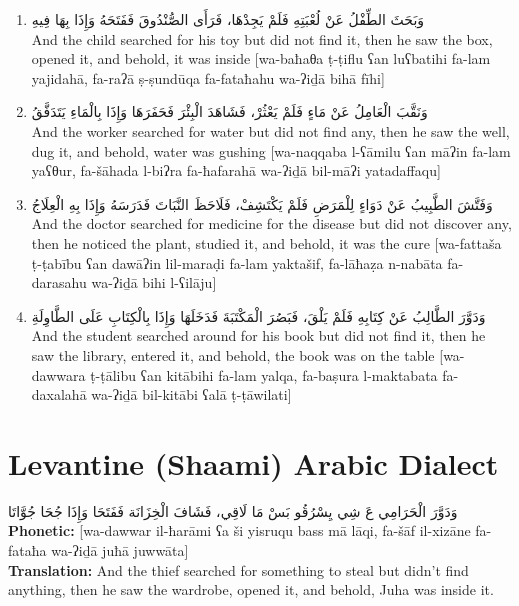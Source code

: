 \documentclass[letterpaper,12pt]{article}
\begin{document}
\begin{enumerate}
\item \textarabic{وَبَحَثَ الطِّفْلُ عَنْ لُعْبَتِهِ فَلَمْ يَجِدْهَا، فَرَأَى الصُّنْدُوقَ فَفَتَحَهُ وَإِذَا بِهَا فِيهِ}\\
And the child searched for his toy but did not find it, then he saw the box, opened it, and behold, it was inside [wa-baħaθa ṭ-ṭiflu ʕan luʕbatihi fa-lam yajidahā, fa-raʔā ṣ-ṣundūqa fa-fataħahu wa-ʔiḏā bihā fīhi]

\item \textarabic{وَنَقَّبَ الْعَامِلُ عَنْ مَاءٍ فَلَمْ يَعْثُرْ، فَشَاهَدَ الْبِئْرَ فَحَفَرَهَا وَإِذَا بِالْمَاءِ يَتَدَفَّقُ}\\
And the worker searched for water but did not find any, then he saw the well, dug it, and behold, water was gushing [wa-naqqaba l-ʕāmilu ʕan māʔin fa-lam yaʕθur, fa-šāhada l-biʔra fa-ħafarahā wa-ʔiḏā bil-māʔi yatadaffaqu]

\item \textarabic{وَفَتَّشَ الطَّبِيبُ عَنْ دَوَاءٍ لِلْمَرَضِ فَلَمْ يَكْتَشِفْ، فَلَاحَظَ النَّبَاتَ فَدَرَسَهُ وَإِذَا بِهِ الْعِلَاجُ}\\
And the doctor searched for medicine for the disease but did not discover any, then he noticed the plant, studied it, and behold, it was the cure [wa-fattaša ṭ-ṭabību ʕan dawāʔin lil-maraḍi fa-lam yaktašif, fa-lāħaẓa n-nabāta fa-darasahu wa-ʔiḏā bihi l-ʕilāju]

\item \textarabic{وَدَوَّرَ الطَّالِبُ عَنْ كِتَابِهِ فَلَمْ يَلْقَ، فَبَصُرَ الْمَكْتَبَةَ فَدَخَلَهَا وَإِذَا بِالْكِتَابِ عَلَى الطَّاوِلَةِ}\\
And the student searched around for his book but did not find it, then he saw the library, entered it, and behold, the book was on the table [wa-dawwara ṭ-ṭālibu ʕan kitābihi fa-lam yalqa, fa-baṣura l-maktabata fa-daxalahā wa-ʔiḏā bil-kitābi ʕalā ṭ-ṭāwilati]
\end{enumerate}

\section{Levantine (Shaami) Arabic Dialect}

\begin{tcolorbox}[colback=white,colframe=dialectcolor,title=\textbf{Levantine Version},breakable]
\textarabic{وَدَوَّرَ الْحَرَامِي عَ شِي يِسْرُقُو بَسْ مَا لَاقِي، فَشَافَ الْخِزَانَة فَفَتَحَا وَإِذَا جُحَا جُوَّاتَا}\\
\textbf{Phonetic:} [wa-dawwar il-ħarāmi ʕa ši yisruqu bass mā lāqi, fa-šāf il-xizāne fa-fataħa wa-ʔiḏā juħā juwwāta]\\
\textbf{Translation:} And the thief searched for something to steal but didn't find anything, then he saw the wardrobe, opened it, and behold, Juha was inside it.
\end{tcolorbox}
\end{document}
